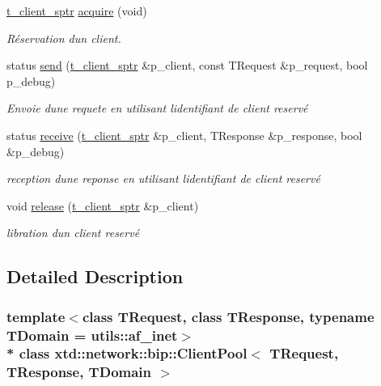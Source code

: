 \begin{DoxyCompactItemize}
\item 
\hyperlink{classxtd_1_1network_1_1bip_1_1ClientPool_ac3b215a76aeb124011801824f993a52b}{t\+\_\+client\+\_\+sptr} \hyperlink{classxtd_1_1network_1_1bip_1_1ClientPool_a9d2d89926ce38e5fbb73ef297945c586}{acquire} (void)
\begin{DoxyCompactList}\small\item\em Réservation d\textquotesingle{}un client. \end{DoxyCompactList}\item 
status \hyperlink{classxtd_1_1network_1_1bip_1_1ClientPool_a1cba2c44a7995319a0aa2bbb7f823ff4}{send} (\hyperlink{classxtd_1_1network_1_1bip_1_1ClientPool_ac3b215a76aeb124011801824f993a52b}{t\+\_\+client\+\_\+sptr} \&p\+\_\+client, const T\+Request \&p\+\_\+request, bool p\+\_\+debug)
\begin{DoxyCompactList}\small\item\em Envoie d\textquotesingle{}une requete en utilisant l\textquotesingle{}identifiant de client reservé \end{DoxyCompactList}\item 
status \hyperlink{classxtd_1_1network_1_1bip_1_1ClientPool_a5884f162a9ca3dee26768eb1f683b6ec}{receive} (\hyperlink{classxtd_1_1network_1_1bip_1_1ClientPool_ac3b215a76aeb124011801824f993a52b}{t\+\_\+client\+\_\+sptr} \&p\+\_\+client, T\+Response \&p\+\_\+response, bool \&p\+\_\+debug)
\begin{DoxyCompactList}\small\item\em reception d\textquotesingle{}une reponse en utilisant l\textquotesingle{}identifiant de client reservé \end{DoxyCompactList}\item 
void \hyperlink{classxtd_1_1network_1_1bip_1_1ClientPool_a390ed6d8afa1812690fbe120bdea5059}{release} (\hyperlink{classxtd_1_1network_1_1bip_1_1ClientPool_ac3b215a76aeb124011801824f993a52b}{t\+\_\+client\+\_\+sptr} \&p\+\_\+client)
\begin{DoxyCompactList}\small\item\em libration d\textquotesingle{}un client reservé \end{DoxyCompactList}\end{DoxyCompactItemize}


\subsection{Detailed Description}
\subsubsection*{template$<$class T\+Request, class T\+Response, typename T\+Domain = utils\+::af\+\_\+inet$>$\\*
class xtd\+::network\+::bip\+::\+Client\+Pool$<$ T\+Request, T\+Response, T\+Domain $>$}



